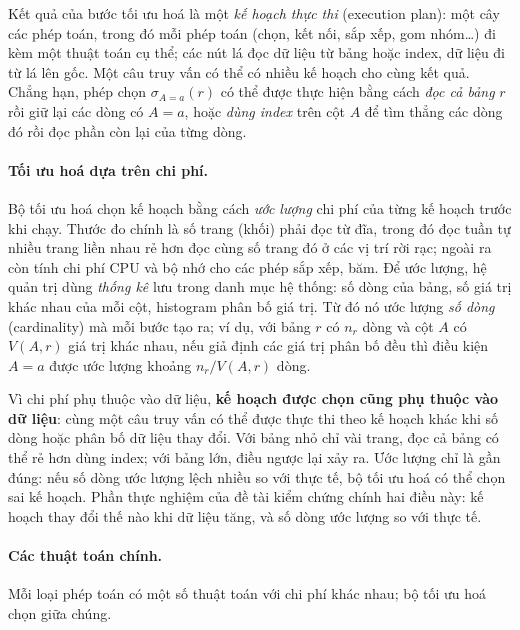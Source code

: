 Kết quả của bước tối ưu hoá là một \textit{kế hoạch thực thi} (execution plan): một cây các phép toán, trong đó mỗi phép toán (chọn, kết nối, sắp xếp, gom nhóm\ldots) đi kèm một thuật toán cụ thể; các nút lá đọc dữ liệu từ bảng hoặc index, dữ liệu đi từ lá lên gốc. Một câu truy vấn có thể có nhiều kế hoạch cho cùng kết quả. Chẳng hạn, phép chọn $\sigma_{A = a}(r)$ có thể được thực hiện bằng cách \textit{đọc cả bảng} $r$ rồi giữ lại các dòng có $A = a$, hoặc \textit{dùng index} trên cột $A$ để tìm thẳng các dòng đó rồi đọc phần còn lại của từng dòng.

\paragraph{Tối ưu hoá dựa trên chi phí.}
Bộ tối ưu hoá chọn kế hoạch bằng cách \textit{ước lượng} chi phí của từng kế hoạch trước khi chạy. Thước đo chính là số trang (khối) phải đọc từ đĩa, trong đó đọc tuần tự nhiều trang liền nhau rẻ hơn đọc cùng số trang đó ở các vị trí rời rạc; ngoài ra còn tính chi phí CPU và bộ nhớ cho các phép sắp xếp, băm. Để ước lượng, hệ quản trị dùng \textit{thống kê} lưu trong danh mục hệ thống: số dòng của bảng, số giá trị khác nhau của mỗi cột, histogram phân bố giá trị. Từ đó nó ước lượng \textit{số dòng} (cardinality) mà mỗi bước tạo ra; ví dụ, với bảng $r$ có $n_r$ dòng và cột $A$ có $V(A, r)$ giá trị khác nhau, nếu giả định các giá trị phân bố đều thì điều kiện $A = a$ được ước lượng khoảng $n_r / V(A, r)$ dòng.

Vì chi phí phụ thuộc vào dữ liệu, \textbf{kế hoạch được chọn cũng phụ thuộc vào dữ liệu}: cùng một câu truy vấn có thể được thực thi theo kế hoạch khác khi số dòng hoặc phân bố dữ liệu thay đổi. Với bảng nhỏ chỉ vài trang, đọc cả bảng có thể rẻ hơn dùng index; với bảng lớn, điều ngược lại xảy ra. Ước lượng chỉ là gần đúng: nếu số dòng ước lượng lệch nhiều so với thực tế, bộ tối ưu hoá có thể chọn sai kế hoạch. Phần thực nghiệm của đề tài kiểm chứng chính hai điều này: kế hoạch thay đổi thế nào khi dữ liệu tăng, và số dòng ước lượng so với thực tế.

\paragraph{Các thuật toán chính.}
Mỗi loại phép toán có một số thuật toán với chi phí khác nhau; bộ tối ưu hoá chọn giữa chúng.

